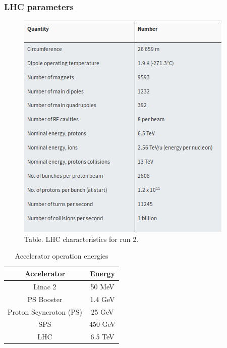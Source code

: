\documentclass[11pt]{beamer}
\begin{document}
\begin{frame}
\frametitle{LHC parameters}
\begin{minipage}[c]{0.48\textwidth}
	\small
	\begin{figure}
	\centering
	\includegraphics[scale=0.4]{figures/lhc-t.png}
	\caption*{Table. LHC characteristics for run 2.}
\end{figure}
\end{minipage}
\hfill
\begin{minipage}[c]{0.48\textwidth}
	\small
	\begin{table}
		\centering
		\caption*{Accelerator operation energies}
		\begin{tabular}{|c|c|}
			\hline
			Accelerator & Energy \\
			\hline
			Linac 2 &  50 MeV \\
			\hline
			PS Booster & 1.4 GeV \\
			\hline
			Proton Scyncroton (PS) & 25 GeV\\
			\hline
			SPS &  450 GeV\\
			\hline
			LHC & 6.5 TeV\\
			\hline
		\end{tabular}
	\end{table}
\end{minipage}
\end{frame}
\end{document}
